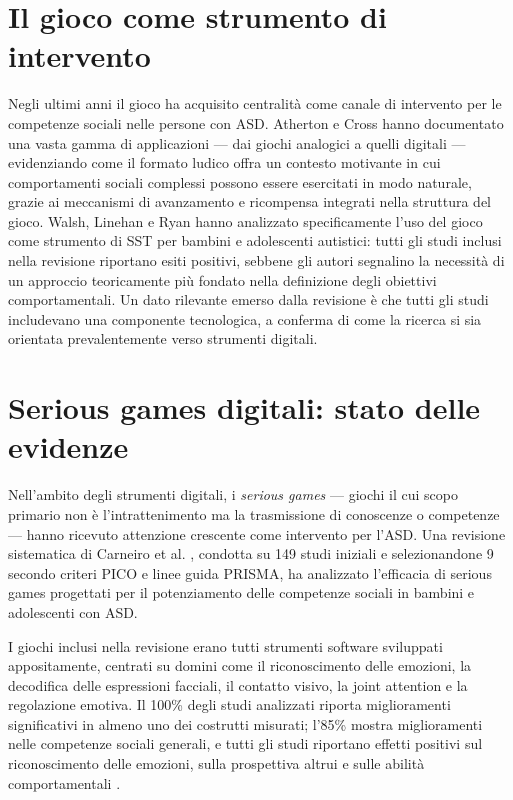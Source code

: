 \documentclass[12pt]{report}
\begin{document}
\section{Il gioco come strumento di intervento}

Negli ultimi anni il gioco ha acquisito centralità come canale di intervento per le competenze sociali nelle persone con ASD. Atherton e Cross \cite{atherton2021} hanno documentato una vasta gamma di applicazioni --- dai giochi analogici a quelli digitali --- evidenziando come il formato ludico offra un contesto motivante in cui comportamenti sociali complessi possono essere esercitati in modo naturale, grazie ai meccanismi di avanzamento e ricompensa integrati nella struttura del gioco. Walsh, Linehan e Ryan \cite{walsh2024} hanno analizzato specificamente l'uso del gioco come strumento di SST per bambini e adolescenti autistici: tutti gli studi inclusi nella revisione riportano esiti positivi, sebbene gli autori segnalino la necessità di un approccio teoricamente più fondato nella definizione degli obiettivi comportamentali. Un dato rilevante emerso dalla revisione è che tutti gli studi includevano una componente tecnologica, a conferma di come la ricerca si sia orientata prevalentemente verso strumenti digitali.

\section{Serious games digitali: stato delle evidenze}

Nell'ambito degli strumenti digitali, i \textit{serious games} --- giochi il cui scopo primario non è l'intrattenimento ma la trasmissione di conoscenze o competenze \cite{carneiro2024} --- hanno ricevuto attenzione crescente come intervento per l'ASD. Una revisione sistematica di Carneiro et al. \cite{carneiro2024}, condotta su 149 studi iniziali e selezionandone 9 secondo criteri PICO e linee guida PRISMA, ha analizzato l'efficacia di serious games progettati per il potenziamento delle competenze sociali in bambini e adolescenti con ASD.

I giochi inclusi nella revisione erano tutti strumenti software sviluppati appositamente, centrati su domini come il riconoscimento delle emozioni, la decodifica delle espressioni facciali, il contatto visivo, la joint attention e la regolazione emotiva. Il 100\% degli studi analizzati riporta miglioramenti significativi in almeno uno dei costrutti misurati; l'85\% mostra miglioramenti nelle competenze sociali generali, e tutti gli studi riportano effetti positivi sul riconoscimento delle emozioni, sulla prospettiva altrui e sulle abilità comportamentali \cite{carneiro2024}.
\end{document}
